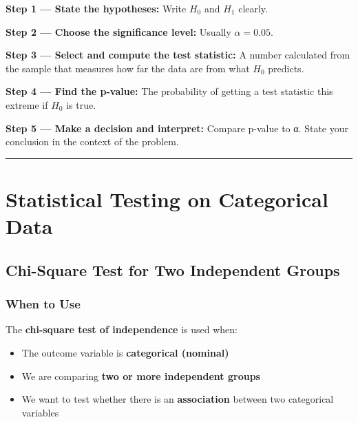 \documentclass[
  12pt,
  letterpaper,
]{book}
\providecommand{\tightlist}{%
  \setlength{\itemsep}{0pt}\setlength{\parskip}{0pt}}
\begin{document}
\begin{tcolorbox}[enhanced jigsaw, arc=.35mm, bottomrule=.15mm, bottomtitle=1mm, breakable, colback=white, colbacktitle=quarto-callout-important-color!10!white, colframe=quarto-callout-important-color-frame, coltitle=black, left=2mm, leftrule=.75mm, opacityback=0, opacitybacktitle=0.6, rightrule=.15mm, title={📋 The 5-Step Framework}, titlerule=0mm, toprule=.15mm, toptitle=1mm]

\textbf{Step 1 --- State the hypotheses:} Write \(H_0\) and \(H_1\)
clearly.

\textbf{Step 2 --- Choose the significance level:} Usually
\(\alpha = 0.05\).

\textbf{Step 3 --- Select and compute the test statistic:} A number
calculated from the sample that measures how far the data are from what
\(H_0\) predicts.

\textbf{Step 4 --- Find the p-value:} The probability of getting a test
statistic this extreme if \(H_0\) is true.

\textbf{Step 5 --- Make a decision and interpret:} Compare p-value to α.
State your conclusion in the context of the problem.

\end{tcolorbox}

\begin{center}\rule{0.5\linewidth}{0.5pt}\end{center}


\chapter{Statistical Testing on Categorical
Data}\label{statistical-testing-on-categorical-data}

\section{Chi-Square Test for Two Independent
Groups}\label{chi-square-test-for-two-independent-groups}

\subsection{When to Use}\label{when-to-use}

The \textbf{chi-square test of independence} is used when:

\begin{itemize}
\tightlist
\item
  The outcome variable is \textbf{categorical (nominal)}
\item
  We are comparing \textbf{two or more independent groups}
\item
  We want to test whether there is an \textbf{association} between two
  categorical variables
\end{itemize}
\end{document}
